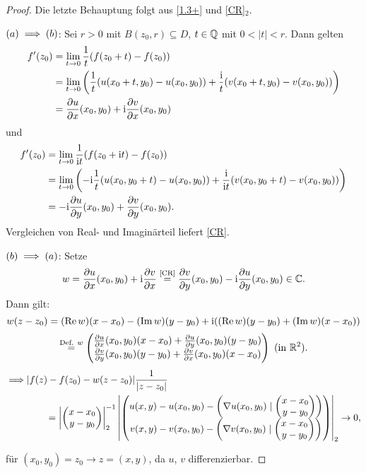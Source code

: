 \documentclass[a4paper,twoside,DIV15,BCOR12mm]{scrbook}
\begin{document}
\begin{proof} Die letzte Behauptung folgt aus \eqref{1.3+} und \eqref{CR}$_2$.

\noindent $(a) \implies (b)$: Sei $r > 0$ mit $B(z_0,r) \subseteq D$, $t\in\mathbb{Q}$ mit $0 < |t| < r$. Dann gelten
\begin{align}
f^\prime(z_0) &= \lim_{t\rightarrow 0} \frac{1}{t} (f(z_0+t) - f(z_0))\nonumber\\
&=  \lim_{t\rightarrow 0} \left(\frac{1}{t} (u(x_0+t,y_0)-u(x_0,y_0)) + \frac{\mathrm{i}}{t} (v(x_0+t,y_0)-v(x_0,y_0))\right)\nonumber\\
\label{1.2}&=\frac{\partial u}{\partial x} (x_0,y_0) + \mathrm{i}\frac{\partial v}{\partial x} (x_0,y_0)
\end{align} und \begin{align}
f^\prime(z_0) &= \lim_{t\rightarrow 0} \frac{1}{\mathrm{i} t} (f(z_0+\mathrm{i} t) - f(z_0))\nonumber\\
&=  \lim_{t\rightarrow 0} \left(-\mathrm{i}\frac{1}{t} (u(x_0,y_0+t)-u(x_0,y_0)) + \frac{\mathrm{i}}{\mathrm{i} t} (v(x_0,y_0+t)-v(x_0,y_0))\right)\nonumber\\
\label{1.3}&=-\mathrm{i}\frac{\partial u}{\partial y} (x_0,y_0) + \frac{\partial v}{\partial y} (x_0,y_0).
\end{align}
Vergleichen von Real- und Imaginärteil liefert \eqref{CR}.

\noindent $(b) \implies (a)$: Setze
\[w=\frac{\partial u}{\partial x} (x_0,y_0) + \mathrm{i}\frac{\partial v}{\partial x}\stackrel{\text{\eqref{CR}}}{=} \frac{\partial v}{\partial y} (x_0,y_0) - \mathrm{i}\frac{\partial u}{\partial y}(x_0,y_0) \in\mathbb{C}.\]
Dann gilt:
\[w(z-z_0) = (\operatorname{Re}{w})(x-x_0) - (\operatorname{Im}{w})(y-y_0) + \mathrm{i}((\operatorname{Re}{w})(y-y_0) + (\operatorname{Im}{w})(x-x_0))\]
\[\stackrel{\text{Def. $w$}}{=} \cmplx{\frac{\partial u}{\partial x} (x_0,y_0)(x-x_0) + \frac{\partial u}{\partial y}(x_0,y_0)(y-y_0)}{\frac{\partial v}{\partial y} (x_0,y_0)(y-y_0) + \frac{\partial v}{\partial x}(x_0,y_0)(x-x_0)}\ \text{(in $\R^2$)}.\]
\begin{align*}
\displaystyle\folgt &|f(z)-f(z_0)-w(z-z_0)|\frac{1}{|z-z_0|}\\
&\qquad= \abs{\cmplx{x-x_0}{y-y_0}}_2^{-1} \abs{\cmplx{u(x,y)-u(x_0,y_0)-\left(\nabla u(x_0,y_0)\mid\cmplx{x-x_0}{y-y_0}\right)}{v(x,y)-v(x_0,y_0)-\left(\nabla v(x_0,y_0)\mid\cmplx{x-x_0}{y-y_0}\right)}}_2 \ra 0,
\end{align*}

für $(x_0,y_0)=z_0 \to z=(x,y)$,
da $u$, $v$ differenzierbar.
\end{proof}
\end{document}

